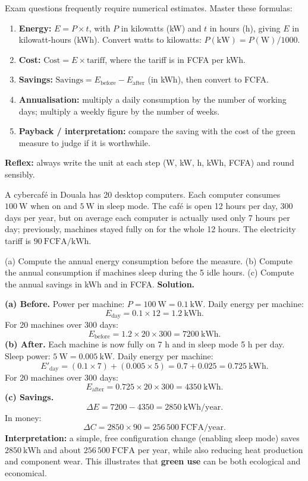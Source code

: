 \documentclass[11pt]{article}
\begin{document}
\begin{methode}
Exam questions frequently require numerical estimates. Master these formulas:
\begin{enumerate}
\item \textbf{Energy:} $E = P \times t$, with $P$ in kilowatts (kW) and $t$ in hours (h), giving $E$ in kilowatt-hours (kWh). Convert watts to kilowatts: $P(\mathrm{kW}) = P(\mathrm{W}) / 1000$.
\item \textbf{Cost:} $\text{Cost} = E \times \text{tariff}$, where the tariff is in FCFA per kWh.
\item \textbf{Savings:} $\text{Savings} = E_{\text{before}} - E_{\text{after}}$ (in kWh), then convert to FCFA.
\item \textbf{Annualisation:} multiply a daily consumption by the number of working days; multiply a weekly figure by the number of weeks.
\item \textbf{Payback / interpretation:} compare the saving with the cost of the green measure to judge if it is worthwhile.
\end{enumerate}
\textbf{Reflex:} always write the unit at each step (W, kW, h, kWh, FCFA) and round sensibly.
\end{methode}

\begin{exoresolu}
A cybercafé in Douala has 20 desktop computers. Each computer consumes $100\ \mathrm{W}$ when on and $5\ \mathrm{W}$ in sleep mode. The café is open 12 hours per day, 300 days per year, but on average each computer is actually used only 7 hours per day; previously, machines stayed fully on for the whole 12 hours. The electricity tariff is $90\ \mathrm{FCFA/kWh}$.\par
(a) Compute the annual energy consumption before the measure. (b) Compute the annual consumption if machines sleep during the 5 idle hours. (c) Compute the annual savings in kWh and in FCFA.
\tcblower
\textbf{Solution.}\par
\textbf{(a) Before.} Power per machine: $P = 100\ \mathrm{W} = 0.1\ \mathrm{kW}$. Daily energy per machine:
\[ E_{\text{day}} = 0.1 \times 12 = 1.2\ \mathrm{kWh}. \]
For 20 machines over 300 days:
\[ E_{\text{before}} = 1.2 \times 20 \times 300 = 7200\ \mathrm{kWh}. \]
\textbf{(b) After.} Each machine is now fully on 7 h and in sleep mode 5 h per day. Sleep power: $5\ \mathrm{W} = 0.005\ \mathrm{kW}$. Daily energy per machine:
\[ E'_{\text{day}} = (0.1 \times 7) + (0.005 \times 5) = 0.7 + 0.025 = 0.725\ \mathrm{kWh}. \]
For 20 machines over 300 days:
\[ E_{\text{after}} = 0.725 \times 20 \times 300 = 4350\ \mathrm{kWh}. \]
\textbf{(c) Savings.}
\[ \Delta E = 7200 - 4350 = 2850\ \mathrm{kWh/year}. \]
In money:
\[ \Delta C = 2850 \times 90 = 256\,500\ \mathrm{FCFA/year}. \]
\textbf{Interpretation:} a simple, free configuration change (enabling sleep mode) saves $2850\ \mathrm{kWh}$ and about $256\,500\ \mathrm{FCFA}$ per year, while also reducing heat production and component wear. This illustrates that \textbf{green use} can be both ecological and economical.
\end{exoresolu}
\end{document}
